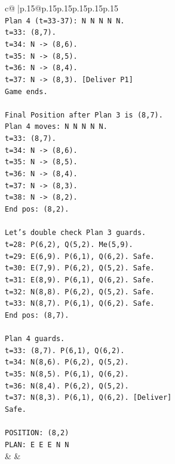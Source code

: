 \documentclass{article}
\begin{document}
{\begin{supertabular}{c@{$\;$}|p{.15\linewidth}@{}p{.15\linewidth}p{.15\linewidth}p{.15\linewidth}p{.15\linewidth}p{.15\linewidth}}
{{{\\ 
\texttt{Plan 4 (t=33{-}37): N N N N N.} \\
\texttt{t=33: (8,7).} \\
\texttt{t=34: N {-}> (8,6).} \\
\texttt{t=35: N {-}> (8,5).} \\
\texttt{t=36: N {-}> (8,4).} \\
\texttt{t=37: N {-}> (8,3). {[}Deliver P1{]}} \\
\texttt{Game ends.} \\
\\ 
\texttt{Final Position after Plan 3 is (8,7).} \\
\texttt{Plan 4 moves: N N N N N.} \\
\texttt{t=33: (8,7).} \\
\texttt{t=34: N {-}> (8,6).} \\
\texttt{t=35: N {-}> (8,5).} \\
\texttt{t=36: N {-}> (8,4).} \\
\texttt{t=37: N {-}> (8,3).} \\
\texttt{t=38: N {-}> (8,2).} \\
\texttt{End pos: (8,2).} \\
\\ 
\texttt{Let's double check Plan 3 guards.} \\
\texttt{t=28: P(6,2), Q(5,2). Me(5,9).} \\
\texttt{t=29: E(6,9). P(6,1), Q(6,2). Safe.} \\
\texttt{t=30: E(7,9). P(6,2), Q(5,2). Safe.} \\
\texttt{t=31: E(8,9). P(6,1), Q(6,2). Safe.} \\
\texttt{t=32: N(8,8). P(6,2), Q(5,2). Safe.} \\
\texttt{t=33: N(8,7). P(6,1), Q(6,2). Safe.} \\
\texttt{End pos: (8,7).} \\
\\ 
\texttt{Plan 4 guards.} \\
\texttt{t=33: (8,7). P(6,1), Q(6,2).} \\
\texttt{t=34: N(8,6). P(6,2), Q(5,2).} \\
\texttt{t=35: N(8,5). P(6,1), Q(6,2).} \\
\texttt{t=36: N(8,4). P(6,2), Q(5,2).} \\
\texttt{t=37: N(8,3). P(6,1), Q(6,2). {[}Deliver{]}} \\
\texttt{Safe.} \\
\\ 
\texttt{POSITION: (8,2)} \\
\texttt{PLAN: E E E N N} \\
            }
        }
    }
    & & \\ \\


\end{supertabular}}
\end{document}
